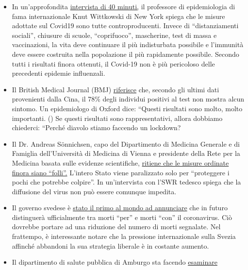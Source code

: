 \begin{itemize}
\tightlist
\item
  In un'approfondita
  \href{https://www.youtube.com/watch?v=lGC5sGdz4kg}{intervista di 40
  minuti,} il professore di epidemiologia di fama internazionale Knut
  Wittkowski di New York spiega che le misure adottate sul Covid19 sono
  tutte controproducenti. Invece di ``distanziamenti sociali'', chiusure
  di scuole, ``coprifuoco'', mascherine, test di massa e vaccinazioni,
  la vita deve continuare il più indisturbata possibile e l'immunità
  deve essere costruita nella popolazione il più rapidamente possibile.
  Secondo tutti i risultati finora ottenuti, il Covid-19 non è più
  pericoloso delle precedenti epidemie influenzali.
\item
  Il British Medical Journal (BMJ)
  \href{https://www.bmj.com/content/369/bmj.m1375}{riferisce} che,
  secondo gli ultimi dati provenienti dalla Cina, il 78\% degli
  individui positivi al test non mostra alcun sintomo. Un epidemiologo
  di Oxford dice: ``Questi risultati sono molto, molto importanti. () Se
  questi risultati sono rappresentativi, allora dobbiamo chiederci:
  ``Perché diavolo stiamo faccendo un lockdown?
\item
  Il Dr. Andreas Sönnichsen, capo del Dipartimento di Medicina Generale
  e di Famiglia dell'Università di Medicina di Vienna e presidente della
  Rete per la Medicina basata sulle evidenze scientifiche,
  \href{https://www.diepresse.com/5794224/was-machen-wir-da-auf-den-intensivstationen-eigentlich}{ritiene
  che le misure ordinate finora siano ``folli''.} L'intero Stato viene
  paralizzato solo per ``proteggere i pochi che potrebbe colpire''. In
  un'intervista con l'SWR tedesco spiega che la diffusione del virus non
  può essere comunque impedita.
\item
  Il governo svedese è
  \href{https://www.telegraph.co.uk/news/2020/04/03/coronavirus-swedish-experiment-could-prove-britain-wrong/}{stato
  il primo al mondo ad annunciare} che in futuro distinguerà
  ufficialmente tra morti ``per'' e morti ``con'' il coronavirus. Ciò
  dovrebbe portare ad una riduzione del numero di morti segnalate. Nel
  frattempo, è interessante notare che la pressione internazionale sulla
  Svezia affinché abbandoni la sua strategia liberale è in costante
  aumento.
\item
  Il dipartimento di salute pubblica di Amburgo sta facendo
  \href{https://www.t-online.de/nachrichten/deutschland/id_87636856/coronavirus-hamburg-will-nur-echte-covid-19-tote-zaehlen.html}{esaminare
}
\end{itemize}
